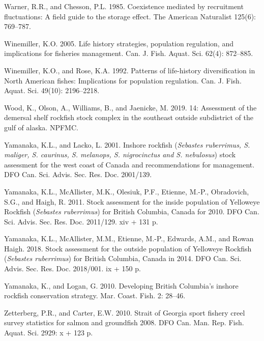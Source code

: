 \documentclass[11pt]{book}
\begin{document}
\leavevmode\hypertarget{ref-warner1985}{}%
Warner, R.R., and Chesson, P.L. 1985. Coexistence mediated by recruitment fluctuations: A field guide to the storage effect. The American Naturalist 125(6): 769--787.

\leavevmode\hypertarget{ref-winemiller2005}{}%
Winemiller, K.O. 2005. Life history strategies, population regulation, and implications for fisheries management. Can. J. Fish. Aquat. Sci. 62(4): 872--885.

\leavevmode\hypertarget{ref-winemiller1992}{}%
Winemiller, K.O., and Rose, K.A. 1992. Patterns of life-history diversification in North American fishes: Implications for population regulation. Can. J. Fish. Aquat. Sci. 49(10): 2196--2218.

\leavevmode\hypertarget{ref-wood2019}{}%
Wood, K., Olson, A., Williams, B., and Jaenicke, M. 2019. 14: Assessment of the demersal shelf rockfish stock complex in the southeast outside subdistrict of the gulf of alaska. NPFMC.

\leavevmode\hypertarget{ref-yamanaka2001}{}%
Yamanaka, K.L., and Lacko, L. 2001. Inshore rockfish (\emph{Sebastes ruberrimus, S. maliger, S. caurinus, S. melanops, S. nigrocinctus and S. nebulosus}) stock assessment for the west coast of Canada and recommendations for management. DFO Can. Sci. Advis. Sec. Res. Doc. 2001/139.

\leavevmode\hypertarget{ref-yamanaka2011}{}%
Yamanaka, K.L., McAllister, M.K., Olesiuk, P.F., Etienne, M.-P., Obradovich, S.G., and Haigh, R. 2011. Stock assessment for the inside population of Yelloweye Rockfish (\emph{Sebastes ruberrimus}) for British Columbia, Canada for 2010. DFO Can. Sci. Advis. Sec. Res. Doc. 2011/129. xiv + 131 p.

\leavevmode\hypertarget{ref-yamanaka2018yelloweyeoutside}{}%
Yamanaka, K.L., McAllister, M.M., Etienne, M.-P., Edwards, A.M., and Rowan Haigh. 2018. Stock assessment for the outside population of Yelloweye Rockfish (\emph{Sebastes ruberrimus}) for British Columbia, Canada in 2014. DFO Can. Sci. Advis. Sec. Res. Doc. 2018/001. ix + 150 p.

\leavevmode\hypertarget{ref-yamanaka2010}{}%
Yamanaka, K., and Logan, G. 2010. Developing British Columbia's inshore rockfish conservation strategy. Mar. Coast. Fish. 2: 28--46.

\leavevmode\hypertarget{ref-zetterberg2010}{}%
Zetterberg, P.R., and Carter, E.W. 2010. Strait of Georgia sport fishery creel survey statistics for salmon and groundfish 2008. DFO Can. Man. Rep. Fish. Aquat. Sci. 2929: x + 123 p.
\end{document}
